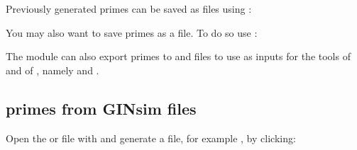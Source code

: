 \documentclass[letterpaper,10pt,english]{sphinxmanual}
\begin{document}
Previously generated primes can be saved as  files using {\hyperref[\detokenize{FileExchange:write-primes}]{}}:

\begin{sphinxVerbatim}[commandchars=\\\{\}]
 
\end{sphinxVerbatim}

You may also want to save primes as a  file.
To do so use {\hyperref[\detokenize{FileExchange:primes2bnet}]{}}:

\begin{sphinxVerbatim}[commandchars=\\\{\}]
 
\end{sphinxVerbatim}

The module {\hyperref[\detokenize{FileExchange:fileexchange}]{}} can also export primes to  and  files to use as inputs for the tools  of {\hyperref[\detokenize{Bibliography:dubrova2011}]{}} and  of {\hyperref[\detokenize{Bibliography:garg2008}]{}}, namely {\hyperref[\detokenize{FileExchange:primes2bns}]{}} and {\hyperref[\detokenize{FileExchange:primes2genysis}]{}}.


\subsection{primes from GINsim files}
\label{\detokenize{Manual:primes-from-ginsim-files}}\label{\detokenize{Manual:id2}}
Open the  or  file with {\hyperref[\detokenize{Installation:installation-ginsim}]{}} and generate a  file, for example , by clicking:
\end{document}
